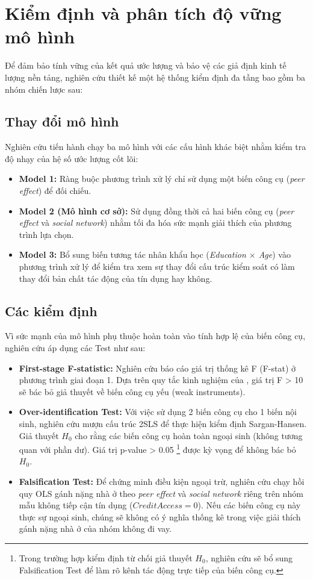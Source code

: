 \documentclass[12pt,a4paper]{report}
\begin{document}
\section{Kiểm định và phân tích độ vững mô hình}

Để đảm bảo tính vững của kết quả ước lượng và bảo vệ các giả định kinh tế lượng nền tảng, nghiên cứu thiết kế một hệ thống kiểm định đa tầng bao gồm ba nhóm chiến lược sau:

\subsection{Thay đổi mô hình}
Nghiên cứu tiến hành chạy ba mô hình với các cấu hình khác biệt nhằm kiểm tra độ nhạy của hệ số ước lượng cốt lõi:
\begin{itemize}
	\item \textbf{Model 1:} Ràng buộc phương trình xử lý chỉ sử dụng một biến công cụ (\textit{peer effect}) để đối chiếu.
	\item \textbf{Model 2 (Mô hình cơ sở):} Sử dụng đồng thời cả hai biến công cụ (\textit{peer effect} và \textit{social network}) nhằm tối đa hóa sức mạnh giải thích của phương trình lựa chọn.
	\item \textbf{Model 3:} Bổ sung biến tương tác nhân khẩu học (\textit{Education $\times$ Age}) vào phương trình xử lý để kiểm tra xem sự thay đổi cấu trúc kiểm soát có làm thay đổi bản chất tác động của tín dụng hay không.
\end{itemize}

\subsection{Các kiểm định}
Vì sức mạnh của mô hình phụ thuộc hoàn toàn vào tính hợp lệ của biến công cụ, nghiên cứu áp dụng các Test như sau:
\begin{itemize}
	\item \textbf{First-stage F-statistic:} Nghiên cứu báo cáo giá trị thống kê F (F-stat) ở phương trình giai đoạn 1. Dựa trên quy tắc kinh nghiệm của \textcite{StockYogo2005}, giá trị F > 10 sẽ bác bỏ giả thuyết về biến công cụ yếu (weak instruments).
	
	\item \textbf{Over-identification Test:} Với việc sử dụng 2 biến công cụ cho 1 biến nội sinh, nghiên cứu mượn cấu trúc 2SLS để thực hiện kiểm định Sargan-Hansen. Giả thuyết $H_0$ cho rằng các biến công cụ hoàn toàn ngoại sinh (không tương quan với phần dư). Giá trị p-value > 0.05 \footnote{Trong trường hợp kiểm định từ chối giả thuyết $H_0$, nghiên cứu sẽ bổ sung Falsification Test để làm rõ kênh tác động trực tiếp của biến công cụ.} được kỳ vọng để không bác bỏ $H_0$.
	
	\item \textbf{Falsification Test:} Để chứng minh điều kiện ngoại trừ, nghiên cứu chạy hồi quy OLS gánh nặng nhà ở theo \textit{peer effect} và \textit{social network} riêng trên nhóm mẫu không tiếp cận tín dụng ($CreditAccess = 0$). Nếu các biến công cụ này thực sự ngoại sinh, chúng sẽ không có ý nghĩa thống kê trong việc giải thích gánh nặng nhà ở của nhóm không đi vay.
\end{itemize}
\end{document}
